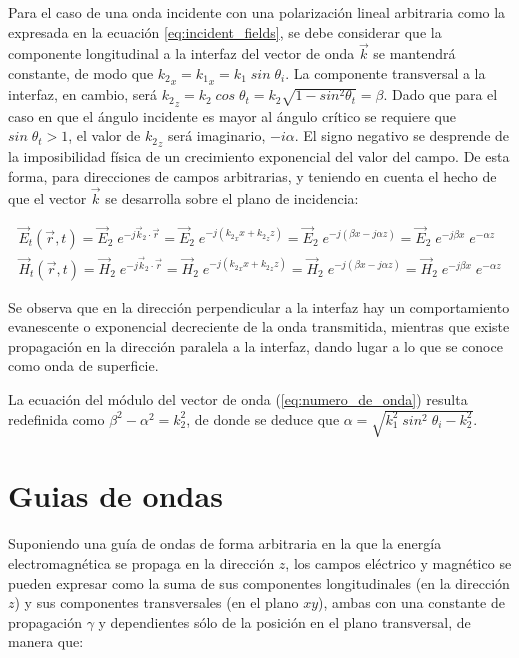 Para el caso de una onda incidente con una polarización lineal arbitraria como la expresada en la ecuación \ref{eq:incident_fields}, se debe considerar que la componente longitudinal a la interfaz del vector de onda $\vec{k}$ se mantendrá constante, de modo que ${k_2}_x = {k_1}_x = k_1 \; sin \; \theta_i$. La componente transversal a la interfaz, en cambio, será ${k_2}_z = k_2\; cos \; \theta_t = k_2 \sqrt{1-sin^2\theta_t} = \beta$. Dado que para el caso en que el ángulo incidente es mayor al ángulo crítico se requiere que $sin\;\theta_t > 1$, el valor de ${k_2}_z$ será imaginario, $-i\alpha$. El signo negativo se desprende de la imposibilidad física de un crecimiento exponencial del valor del campo. De esta forma, para direcciones de campos arbitrarias, y teniendo en cuenta el hecho de que el vector $\vec{k}$ se desarrolla sobre el plano de incidencia:

\begin{subequations}
	\begin{align}
		\vec{E}_t (\vec{r},t) = \vec{E}_2 \; e^{-j \vec{k}_2 \cdot \vec{r}} = \vec{E}_2 \; e^{-j({k_2}_x x + {k_2}_z z)} = \vec{E}_2 \; e^{-j(\beta x - j\alpha z)} = \vec{E}_2 \; e^{-j\beta x} \; e^{- \alpha z}\\
		\vec{H}_t (\vec{r},t) = \vec{H}_2 \; e^{-j \vec{k}_2 \cdot \vec{r}} = \vec{H}_2 \; e^{-j({k_2}_x x + {k_2}_z z)} = \vec{H}_2 \; e^{-j(\beta x - j\alpha z)} = \vec{H}_2 \; e^{-j\beta x} \; e^{- \alpha z}
	\end{align}
\end{subequations}

Se observa que en la dirección perpendicular a la interfaz hay un comportamiento evanescente o exponencial decreciente de la onda transmitida, mientras que existe propagación en la dirección paralela a la interfaz, dando lugar a lo que se conoce como onda de superficie.

La ecuación del módulo del vector de onda (\ref{eq:numero_de_onda}) resulta redefinida como $\beta^2 - \alpha^2 = k_2^2$, de donde se deduce que $\alpha = \sqrt{k_1^2\;sin^2\;\theta_i - k_2^2}$.



\section{Guias de ondas}
\label{subsec_guias_de_ondas}

Suponiendo una guía de ondas de forma arbitraria en la que la energía electromagnética se propaga en la dirección $z$, los campos eléctrico y magnético se pueden expresar como la suma de sus componentes longitudinales (en la dirección $z$) y sus componentes transversales (en el plano $xy$), ambas con una constante de propagación $\gamma$ y dependientes sólo de la posición en el plano transversal, de manera que:

